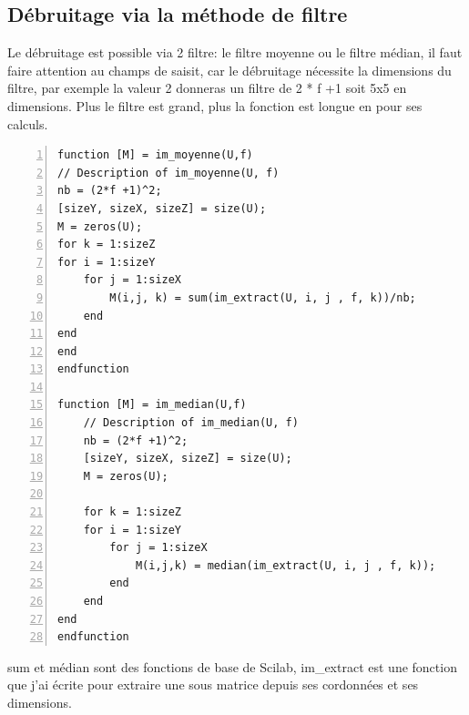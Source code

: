 \documentclass[12pt, letterpaper]{article}
\begin{document}
\subsection{Débruitage via la méthode de filtre}
Le débruitage est possible via 2 filtre: le filtre moyenne ou le filtre médian, il faut faire attention au champs de saisit,
car le débruitage nécessite la dimensions du filtre, par exemple la valeur 2 donneras un filtre de 2 * f +1 soit 5x5 en dimensions.
Plus le filtre est grand, plus la fonction est longue en pour ses calculs.
\begin{Verbatim}[numbers=left,xleftmargin = 5mm]
function [M] = im_moyenne(U,f)
// Description of im_moyenne(U, f)
nb = (2*f +1)^2;
[sizeY, sizeX, sizeZ] = size(U);
M = zeros(U);
for k = 1:sizeZ
for i = 1:sizeY
    for j = 1:sizeX
        M(i,j, k) = sum(im_extract(U, i, j , f, k))/nb;
    end
end
end
endfunction

function [M] = im_median(U,f)
    // Description of im_median(U, f)
    nb = (2*f +1)^2;
    [sizeY, sizeX, sizeZ] = size(U);
    M = zeros(U);

    for k = 1:sizeZ
    for i = 1:sizeY
        for j = 1:sizeX
            M(i,j,k) = median(im_extract(U, i, j , f, k));
        end
    end
end
endfunction
\end{Verbatim}
sum et médian sont des fonctions de base de Scilab, im\_extract est une fonction que j'ai écrite pour extraire une sous matrice depuis ses cordonnées et ses dimensions.
\end{document}
